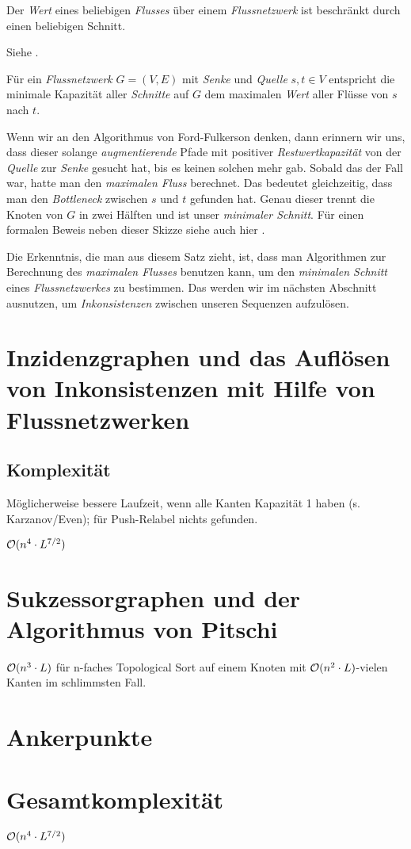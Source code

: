 \begin{lemma}
	Der \emph{Wert} eines beliebigen \emph{Flusses} über einem \emph{Flussnetzwerk} ist beschränkt durch einen beliebigen Schnitt.
\end{lemma}

\begin{beweis}
	Siehe \cite{clrs09}.
\end{beweis}

\begin{satz}
	Für ein \emph{Flussnetzwerk} $G = (V,E)$ mit \emph{Senke} und \emph{Quelle} $s, t \in V$ entspricht die minimale Kapazität aller \emph{Schnitte} auf $G$ dem maximalen \emph{Wert} aller Flüsse von $s$ nach $t$. 
\end{satz} 

\begin{beweis}
	Wenn wir an den Algorithmus von Ford-Fulkerson denken, dann erinnern wir uns, dass dieser solange \emph{augmentierende} Pfade mit positiver \emph{Restwertkapazität} von der \emph{Quelle} zur \emph{Senke} gesucht hat, bis es keinen solchen mehr gab. Sobald das der Fall war, hatte man den \emph{maximalen Fluss} berechnet. Das bedeutet gleichzeitig, dass man den \emph{Bottleneck} zwischen $s$ und $t$ gefunden hat. Genau dieser trennt die Knoten von $G$ in zwei Hälften und ist unser \emph{minimaler Schnitt}. Für einen formalen Beweis neben dieser Skizze siehe auch hier \cite{clrs09}.
\end{beweis} 

Die Erkenntnis, die man aus diesem Satz zieht, ist, dass man Algorithmen zur Berechnung des \emph{maximalen Flusses} benutzen kann, um den \emph{minimalen Schnitt} eines \emph{Flussnetzwerkes} zu bestimmen. Das werden wir im nächsten Abschnitt ausnutzen, um \emph{Inkonsistenzen} zwischen unseren Sequenzen aufzulösen.

\section{Inzidenzgraphen und das Auflösen von Inkonsistenzen mit Hilfe von Flussnetzwerken}

\subsection{Komplexität}

Möglicherweise bessere Laufzeit, wenn alle Kanten Kapazität 1 haben (s. Karzanov/Even); für Push-Relabel nichts gefunden.

$\mathcal{O}(n^4\cdot L^{7/2})$

\section{Sukzessorgraphen und der Algorithmus von Pitschi}
$\mathcal{O}(n^3\cdot L)$ für n-faches Topological Sort auf einem Knoten mit $\mathcal{O}(n^2\cdot L)$-vielen Kanten im schlimmsten Fall.

\section{Ankerpunkte}

\section{Gesamtkomplexität}
$\mathcal{O}(n^4\cdot L^{7/2})$ 